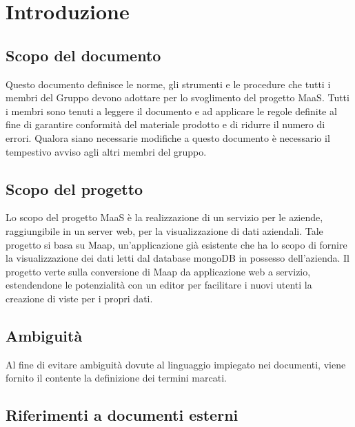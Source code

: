\section{Introduzione}
\subsection{Scopo del documento}
Questo documento definisce le norme, gli strumenti e le procedure che tutti i membri del Gruppo devono adottare per lo svoglimento del progetto MaaS. Tutti i membri sono tenuti a leggere il documento e ad applicare le regole definite al fine di garantire conformità del materiale prodotto e di ridurre il numero di errori. Qualora siano necessarie modifiche a questo documento è necessario il tempestivo avviso agli altri membri del gruppo.

\subsection{Scopo del progetto}
Lo scopo del progetto MaaS è la realizzazione di un servizio per le aziende, raggiungibile in un server web, per la visualizzazione di dati aziendali. Tale progetto si basa su Maap, un'applicazione già esistente che ha lo scopo di fornire la visualizzazione dei dati letti dal database mongoDB in possesso dell'azienda. Il progetto verte sulla conversione di Maap da applicazione web a servizio, estendendone le potenzialità con un editor per facilitare i nuovi utenti la creazione di viste per i propri dati.

\subsection{Ambiguit\`a}
Al fine di evitare ambiguità dovute al linguaggio impiegato nei documenti, viene fornito il \Glossario contente la definizione dei termini marcati.

\subsection{Riferimenti a documenti esterni}
